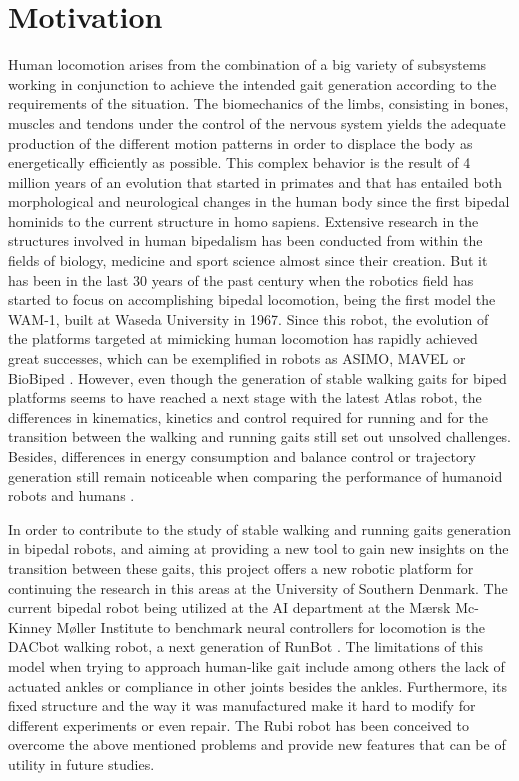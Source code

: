\section{Motivation}
\label{sec_motivation}
Human locomotion arises from the combination of a big variety of subsystems working in conjunction to achieve the intended gait generation according to the requirements of the situation.
The biomechanics of the limbs, consisting in bones, muscles and tendons under the control of the nervous system yields the adequate production of the different motion patterns in order to displace the body as energetically efficiently as possible.
This complex behavior is the result of 4 million years of an evolution \cite{bipedalism} that started in primates and that has entailed both morphological and neurological changes in the human body since the first bipedal hominids to the current structure in homo sapiens. 
Extensive research in the structures involved in human bipedalism has been conducted from within the fields of biology, medicine and sport science almost since their creation. 
But it has been in the last 30 years of the past century when the robotics field has started to focus on accomplishing bipedal locomotion, being the first model the WAM-1, built at Waseda University in 1967.
Since this robot, the evolution of the platforms targeted at mimicking human locomotion has rapidly achieved great successes, which can be exemplified in robots as ASIMO, MAVEL or BioBiped \cite{}.  
However, even though the generation of stable walking gaits for biped platforms seems to have reached a next stage with the latest Atlas robot, the differences in kinematics, kinetics and control required for running and for the transition between the walking and running gaits still set out unsolved challenges.
Besides, differences in energy consumption and balance control or trajectory generation still remain noticeable when comparing the performance of humanoid robots and humans \cite{h7}.

In order to contribute to the study of stable walking and running gaits generation in bipedal robots, and aiming at providing a new tool to gain new insights on the transition between these gaits, this project offers a new robotic platform for continuing the research in this areas at the University of Southern Denmark.
The current bipedal robot being utilized at the AI department at the Mærsk Mc-Kinney Møller Institute to benchmark neural controllers for locomotion is the DACbot walking robot, a next generation of RunBot \cite{runbot1} \cite{runbot2}.
The limitations of this model when trying to approach human-like gait include among others the lack of actuated ankles or compliance in other joints besides the ankles. 
Furthermore, its fixed structure and the way it was manufactured make it hard to modify for different experiments or even repair.
The Rubi robot has been conceived to overcome the above mentioned problems and provide new features that can be of utility in future studies.



